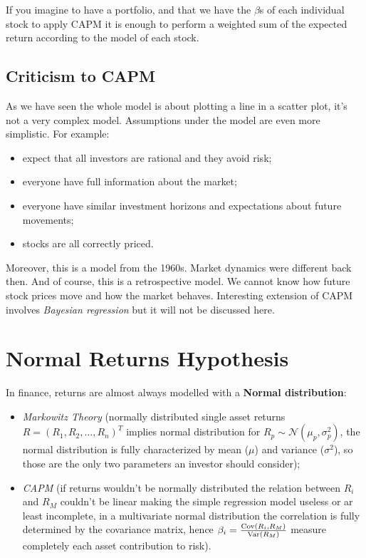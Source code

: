If you imagine to have a portfolio, and that we have the $\beta$s of each individual stock to apply CAPM it is enough to perform a weighted sum of the expected return according to the model of each stock.

\subsection{Criticism to CAPM}
As we have seen the whole model is about plotting a line in a scatter plot, it’s not a very complex model. Assumptions under the model are even more simplistic. For example:
\begin{itemize}
\tightlist
\item expect that all investors are rational and they avoid risk;
\item everyone have full information about the market;
\item everyone have similar investment horizons and expectations about future movements;
\item stocks are all correctly priced.
\end{itemize}

Moreover, this is a model from the 1960s. Market dynamics were different back then. And of course, this is a retrospective model. We cannot know how future stock prices move and how the market behaves.
Interesting extension of CAPM involves \emph{Bayesian regression}\cite{bib:bayesian_regression} but it will not be discussed here.

\section{Normal Returns Hypothesis}

In finance, returns are almost always modelled with a \textbf{Normal distribution}: 
\begin{itemize}
	\item \emph{Markowitz Theory} (normally distributed single asset returns $R = (R_1, R_2, \dots, R_n)^T$ implies normal distribution for $R_p \sim \mathcal{N}(\mu_p, \sigma_p^2)$, the normal distribution is fully characterized by mean ($\mu$) and variance ($\sigma^2$), so those are the only two parameters an investor should consider);
	\item \emph{CAPM} (if returns wouldn't be normally distributed the relation between $R_i$ and $R_M$ couldn't be linear making the simple regression model useless or ar least incomplete, in a multivariate normal distribution the correlation is fully determined by the covariance matrix, hence $\beta_i = \frac{\operatorname{Cov}(R_i, R_M)}{\operatorname{Var}(R_M)}$ measure completely each asset contribution to risk).
\end{itemize} 

